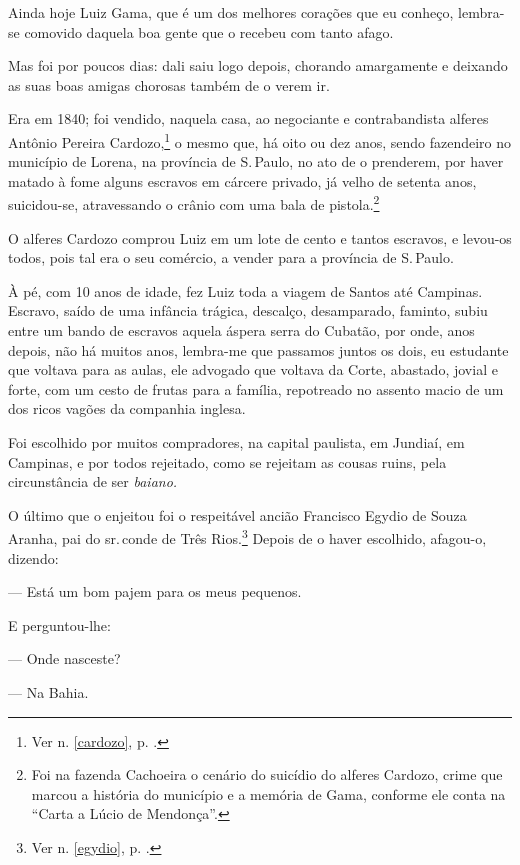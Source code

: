 Ainda hoje Luiz Gama, que é um dos melhores corações que eu conheço,
lembra-se comovido daquela boa gente que o recebeu com tanto afago.

Mas foi por poucos dias: dali saiu logo depois, chorando amargamente e
deixando as suas boas amigas chorosas também de o verem ir.

Era em 1840; foi vendido, naquela casa, ao negociante e contrabandista
alferes Antônio Pereira Cardozo,\footnote{Ver n. \ref{cardozo}, p. \pageref{cardozo}.} o mesmo que, há oito
ou dez anos, sendo fazendeiro no município de Lorena, na província de S.\,Paulo, no ato de o prenderem, por haver matado à fome alguns escravos em
cárcere privado, já velho de setenta anos, suicidou-se, atravessando o
crânio com uma bala de pistola.\footnote{Foi na fazenda Cachoeira o
  cenário do suicídio do alferes Cardozo, crime que marcou a história do
  município e a memória de Gama, conforme ele conta na ``Carta a
  Lúcio de Mendonça''.}

O alferes Cardozo comprou Luiz em um lote de cento e tantos escravos, e
levou-os todos, pois tal era o seu comércio, a vender para a província
de S.\,Paulo.

À pé, com 10 anos de idade, fez Luiz toda a viagem de Santos até
Campinas. Escravo, saído de uma infância trágica, descalço, desamparado,
faminto, subiu entre um bando de escravos aquela áspera serra do
Cubatão, por onde, anos depois, não há muitos anos, lembra-me que
passamos juntos os dois, eu estudante que voltava para as aulas, ele
advogado que voltava da Corte, abastado, jovial e forte, com um cesto de
frutas para a família, repotreado no assento macio de um dos ricos
vagões da companhia inglesa.

Foi escolhido por muitos compradores, na capital paulista, em
Jundiaí,
em Campinas, e por todos rejeitado, como se rejeitam as cousas ruins,
pela circunstância de ser \emph{baiano.}

O último que o enjeitou foi o respeitável ancião Francisco Egydio de
Souza Aranha, pai do sr.\,conde de Três Rios.\footnote{Ver n. \ref{egydio}, p. \pageref{egydio}.} Depois de o
haver escolhido, afagou-o, dizendo:

--- Está um bom pajem para os meus pequenos.

E perguntou-lhe:

--- Onde nasceste?

--- Na Bahia.

